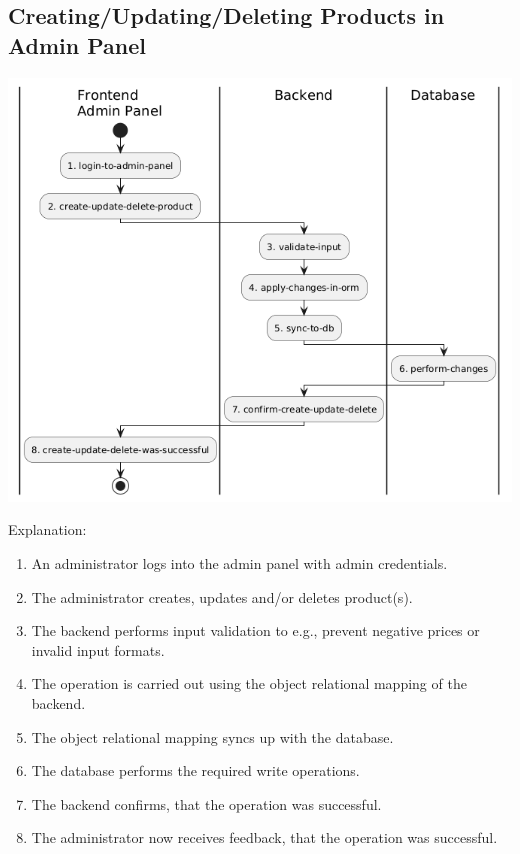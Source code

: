 \hypertarget{__runtime_scenario_3}{%
\subsection{Creating/Updating/Deleting Products in Admin Panel}\label{__runtime_scenario_3}}
\includegraphics{images/uml_swimlane_product_create_update_delete.png}

Explanation:
\begin{enumerate}
  \item An administrator logs into the admin panel with admin credentials.
  \item The administrator creates, updates and/or deletes product(s).
  \item The backend performs input validation to e.g., prevent negative prices or invalid input formats.
  \item The operation is carried out using the object relational mapping of the backend.
  \item The object relational mapping syncs up with the database.
  \item The database performs the required write operations.
  \item The backend confirms, that the operation was successful.
  \item The administrator now receives feedback, that the operation was successful.
\end{enumerate}
